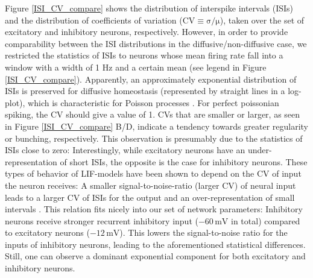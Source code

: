 \documentclass[10pt,a4paper]{article}
\begin{document}
Figure \ref{ISI_CV_compare} shows the distribution of interspike intervals (ISIs) and the distribution of coefficients of variation ($\mathrm{CV\equiv\sigma/\mu}$), taken over the set of excitatory and inhibitory neurons, respectively. However, in order to provide comparability between the ISI distributions in the diffusive/non-diffusive case, we restricted the statistics of ISIs to neurons whose mean firing rate fall into a window with a width of 1 Hz and a certain mean (see legend in Figure \ref{ISI_CV_compare}). Apparently, an approximately exponential distribution of ISIs is preserved for diffusive homeostasis (represented by straight lines in a log-plot), which is characteristic for Poisson processes \cite[p. 27]{Theor_Neur_Dayan}. For perfect poissonian spiking, the CV should give a value of 1. CVs that are smaller or larger, as seen in Figure \ref{ISI_CV_compare} B/D, indicate a tendency towards greater regularity or bunching, respectively. This observation is presumably due to the statistics of ISIs close to zero: Interestingly, while excitatory neurons have an  under-representation of short ISIs, the opposite is the case for inhibitory neurons. These types of behavior of LIF-models have been shown to depend on the CV of input the neuron receives: A smaller signal-to-noise-ratio (larger CV) of neural input leads to a larger CV of ISIs for the output and an over-representation of small intervals \cite{Ostojic2011}. This relation fits nicely into our set of network parameters: Inhibitory neurons receive stronger recurrent inhibitory input ($\mathrm{-60\,mV}$ in total) compared to excitatory neurons ($\mathrm{-12\,mV}$). This lowers the signal-to-noise ratio for the inputs of inhibitory neurons, leading to the aforementioned statistical differences. Still, one can observe a dominant exponential component for both excitatory and inhibitory neurons.
\end{document}
